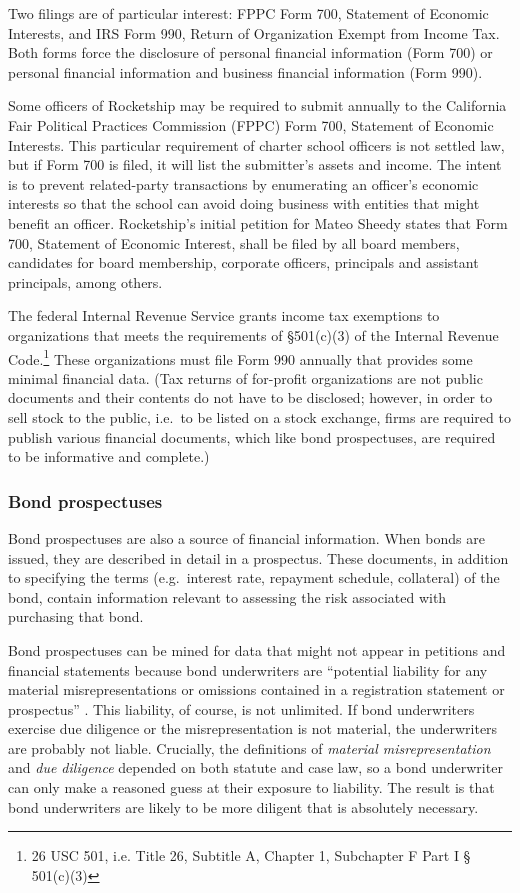 Two filings are of particular interest: FPPC Form 700, Statement of Economic Interests, and IRS Form 990, Return of Organization Exempt from Income Tax. Both forms force the disclosure of personal financial information (Form 700) or personal financial information and business financial information (Form 990). 

Some officers of Rocketship may be required to submit annually to the California Fair Political Practices Commission (FPPC) Form 700, Statement of Economic Interests. This particular requirement of charter school officers is not settled law, but if Form 700 is filed, it will list the submitter's assets and income. The intent is to prevent related-party transactions by enumerating an officer's economic interests so that the school can avoid doing business with entities that might benefit an officer. Rocketship's initial petition for Mateo Sheedy states that Form 700, Statement of Economic Interest, shall be filed by all board members, candidates for board membership, corporate officers, principals and assistant principals, among others. 

The federal Internal Revenue Service grants income tax exemptions to organizations that meets the requirements of §501(c)(3) of the  Internal Revenue Code.\footnote{26 USC 501, i.e. Title 26, Subtitle A, Chapter 1, Subchapter F Part I § 501(c)(3)} These organizations must file Form 990 annually that provides some minimal financial data. (Tax returns of for-profit organizations are not public documents and their contents do not have to be disclosed; however, in order to sell stock to the public, i.e.~to be listed on a stock exchange, firms are required to publish various financial documents, which like bond prospectuses, are required to be informative and complete.) %

\subsubsection{Bond prospectuses}\indent

Bond prospectuses are also a source of financial information. When bonds are issued, they are  described in detail in a prospectus. These documents, in addition to specifying the terms (e.g. interest rate, repayment schedule, collateral) of the bond, contain information relevant to assessing the risk associated with purchasing that bond.

Bond prospectuses can be mined for data that might not appear in petitions and financial statements because bond underwriters are ``potential liability for any material misrepresentations or omissions contained in a registration statement or prospectus'' \parencite{Block.etal2008}. This liability, of course, is not unlimited. If bond underwriters exercise due diligence or the misrepresentation is not material, the underwriters are probably not liable. Crucially, the definitions of \textit{material misrepresentation} and \textit{due diligence} depended on both statute and case law, so a bond underwriter can only make a reasoned guess at their exposure to liability. The result is that bond underwriters are likely to be more diligent that is absolutely necessary.

